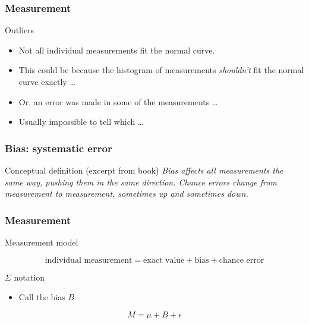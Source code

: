 \documentclass[handout]{beamer}
\begin{document}

   \begin{frame} \frametitle{Measurement}

   \begin{block}
   {Outliers}
   \begin{itemize}
   \item Not all individual measurements fit the
   normal curve.
   \item This could be because the histogram of
   measurements {\em shouldn't} fit the normal curve exactly \dots
   \item Or, an error was made in some of the measurements \dots
   \item Usually impossible to tell which \dots
   \end{itemize}
   \end{block}
   \end{frame}


   \begin{frame} \frametitle{Bias: systematic error}

   \begin{block}
   {Conceptual definition (excerpt from book)}
   {\em Bias affects all measurements the same way, pushing them
   in the same direction. Chance errors change from measurement
   to measurement, sometimes up and sometimes down.}
   \end{block}
   \end{frame}


   \begin{frame} \frametitle{Measurement}

   \begin{block}
   {Measurement model}

   $$
   \text{individual measurement} = \text{exact value} + \text{bias} + \text{chance error}
   $$
   \end{block}

   \begin{block}
   {$\Sigma$ notation}

   \begin{itemize}
   \item Call the bias $B$
   \end{itemize}

   $$
   M = \mu + B + \epsilon
   $$
   \end{block}
   \end{frame}
\end{document}

